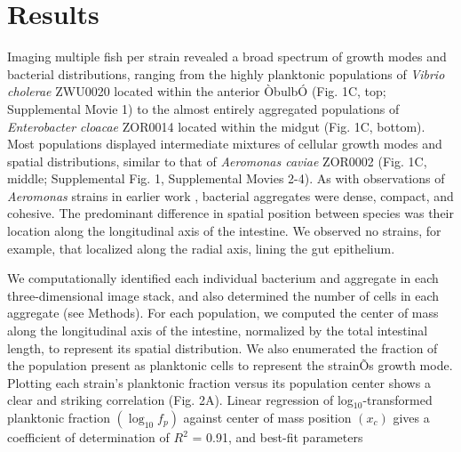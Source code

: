 


\section*{Results}


Imaging multiple fish per strain revealed a broad spectrum of growth modes and bacterial distributions, ranging from the highly planktonic populations of \textit{Vibrio cholerae} ZWU0020 located within the anterior ÒbulbÓ (Fig. 1C, top; Supplemental Movie 1) to the almost entirely aggregated populations of \textit{Enterobacter cloacae} ZOR0014 located within the midgut (Fig. 1C, bottom). Most populations displayed intermediate mixtures of cellular growth modes and spatial distributions, similar to that of \textit{Aeromonas caviae} ZOR0002 (Fig. 1C, middle; Supplemental Fig. 1, Supplemental Movies 2-4). As with observations of \textit{Aeromonas} strains in earlier work \cite{Wiles2016}, bacterial aggregates were dense, compact, and cohesive. The predominant difference in spatial position between species was their location along the longitudinal axis of the intestine. We observed no strains, for example, that localized along the radial axis, lining the gut epithelium.	

We computationally identified each individual bacterium and aggregate in each three-dimensional image stack, and also determined the number of cells in each aggregate \cite{Jemielita2014} (see Methods). For each population, we computed the center of mass along the longitudinal axis of the intestine, normalized by the total intestinal length, to represent its spatial distribution. We also enumerated the fraction of the population present as planktonic cells to represent the strainÕs growth mode. Plotting each strain's planktonic fraction versus its population center shows a clear and striking correlation (Fig. 2A). Linear regression of log$_{10}$-transformed planktonic fraction $(\log_{10}f_p)$ against center of mass position $(x_c)$ gives a coefficient of determination of $R^2$ = 0.91, and best-fit parameters	

